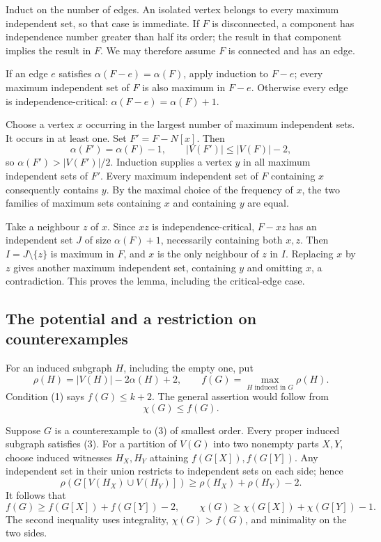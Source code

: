 Induct on the number of edges. An isolated vertex belongs to every maximum independent set, so that case is immediate.
If \(F\) is disconnected, a component has independence number greater than half its order; the result in that component implies the result in \(F\).
We may therefore assume \(F\) is connected and has an edge.

If an edge \(e\) satisfies \(\alpha(F-e)=\alpha(F)\), apply induction to \(F-e\); every maximum independent set of \(F\) is also maximum in \(F-e\).
Otherwise every edge is independence-critical:
\(\alpha(F-e)=\alpha(F)+1\).

Choose a vertex \(x\) occurring in the largest number of maximum independent sets. It occurs in at least one. Set \(F'=F-N[x]\).
Then
\[
 \alpha(F')=\alpha(F)-1,\qquad |V(F')|\leq |V(F)|-2,
\]
so \(\alpha(F')>|V(F')|/2\). Induction supplies a vertex \(y\) in all maximum independent sets of \(F'\).
Every maximum independent set of \(F\) containing \(x\) consequently contains \(y\).
By the maximal choice of the frequency of \(x\), the two families of maximum sets containing \(x\) and containing \(y\) are equal.

Take a neighbour \(z\) of \(x\). Since \(xz\) is independence-critical, \(F-xz\) has an independent set \(J\) of size \(\alpha(F)+1\), necessarily containing both \(x,z\).
Then \(I=J\setminus\{z\}\) is maximum in \(F\), and \(x\) is the only neighbour of \(z\) in \(I\).
Replacing \(x\) by \(z\) gives another maximum independent set, containing \(y\) and omitting \(x\), a contradiction.
This proves the lemma, including the critical-edge case.

\subsection*{The potential and a restriction on counterexamples}
For an induced subgraph \(H\), including the empty one, put
\[
 \rho(H)=|V(H)|-2\alpha(H)+2,\qquad
 f(G)=\max_{H\text{ induced in }G}\rho(H).
\]
Condition (1) says \(f(G)\leq k+2\). The general assertion would follow from
\[
 \chi(G)\leq f(G). \tag{3}
\]

Suppose \(G\) is a counterexample to (3) of smallest order.
Every proper induced subgraph satisfies (3).
For a partition of \(V(G)\) into two nonempty parts \(X,Y\), choose induced witnesses \(H_X,H_Y\) attaining \(f(G[X]),f(G[Y])\).
Any independent set in their union restricts to independent sets on each side; hence
\[
 \rho(G[V(H_X)\cup V(H_Y)])
 \geq \rho(H_X)+\rho(H_Y)-2.
\]
It follows that
\[
 f(G)\geq f(G[X])+f(G[Y])-2,
 \qquad
 \chi(G)\geq\chi(G[X])+\chi(G[Y])-1. \tag{4}
\]
The second inequality uses integrality, \(\chi(G)>f(G)\), and minimality on the two sides.

